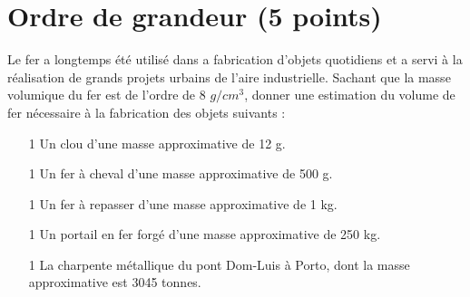 \section{Ordre de grandeur (5 points)}\label{ex:grandeur}

Le fer a longtemps été utilisé dans a fabrication d'objets quotidiens et a servi à la réalisation de grands projets urbains de l'aire industrielle. Sachant que la masse volumique du fer est de l'ordre de 8 $g/cm^3$, donner une estimation du volume de fer nécessaire à la fabrication des objets suivants :

\begin{enumerate}
	\item[1] Un clou d'une masse approximative de 12 g.
	\item[1] Un fer à cheval d'une masse approximative de 500 g.
	\item[1] Un fer à repasser d'une masse approximative de 1 kg.
	\item[1] Un portail en fer forgé d'une masse approximative de 250 kg.
	\item[1] La charpente métallique du pont Dom-Luis à Porto, dont la masse approximative est \num{3045} tonnes.
\end{enumerate}
